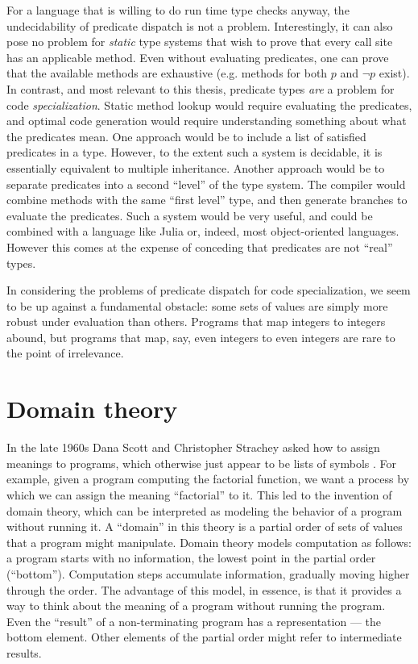 For a language that is willing to do run time type checks anyway, the
undecidability of predicate dispatch is not a problem.
Interestingly, it can also pose no problem for \emph{static} type systems
that wish to prove that every call site has an applicable method.
Even without evaluating predicates, one can prove that the available methods
are exhaustive (e.g. methods for both $p$ and $\neg p$ exist).
In contrast, and most relevant to this thesis, predicate types \emph{are} a
problem for code \emph{specialization}. Static method lookup would require
evaluating the predicates, and optimal code generation would require
understanding something about what the predicates mean. One approach would
be to include a list of satisfied predicates in a type. However, to the
extent such a system is decidable, it is essentially equivalent to multiple
inheritance. Another approach would be to separate predicates into a
second ``level'' of the type system. The compiler would combine methods
with the same ``first level'' type, and then generate branches to evaluate
the predicates. Such a system would be very useful, and could be
combined with a language like Julia or, indeed, most object-oriented
languages. However this comes at the expense of conceding that predicates
are not ``real'' types.

In considering the problems of predicate dispatch for code specialization,
we seem to be up against a fundamental obstacle: some sets of values are
simply more robust under evaluation than others. Programs that map integers
to integers abound, but programs that map, say, even integers to even
integers are rare to the point of irrelevance.


\section{Domain theory}

In the late 1960s Dana Scott and Christopher Strachey asked how to assign
meanings to programs, which otherwise just appear to be lists of symbols
\cite{scott1971toward}.
For example, given a program computing the factorial function, we
want a process by which we can assign the meaning ``factorial'' to it.
This led to the invention of domain theory, which can be interpreted
as modeling the behavior of a program without running it.
A ``domain'' in this theory is a
partial order of sets of values that a program might manipulate. 
Domain theory models computation as follows: a program starts with no
information, the lowest point in the partial order (``bottom'').
Computation steps accumulate information, gradually moving higher through
the order. The advantage of this model, in essence, is that it provides a
way to think about the meaning of a program without running the program.
Even the ``result'' of a non-terminating program has a representation ---
the bottom element. Other elements of the partial order might refer to
intermediate results.

